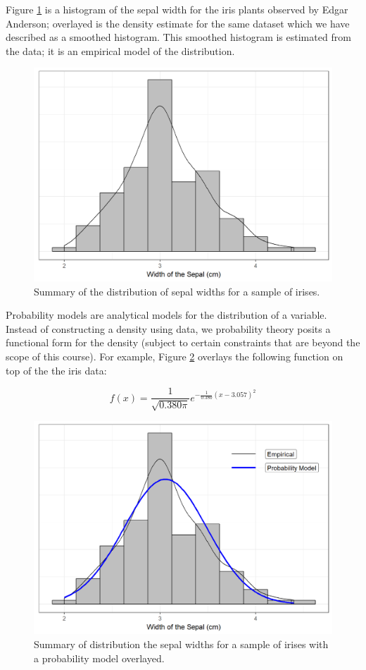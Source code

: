 \documentclass[]{book}
\theoremstyle{definition}
\theoremstyle{definition}
\theoremstyle{definition}
\theoremstyle{remark}
\begin{document}
Figure \ref{fig:anovaclassical-iris-histogram} is a histogram of the
sepal width for the iris plants observed by Edgar Anderson; overlayed is
the density estimate for the same dataset which we have described as a
smoothed histogram. This smoothed histogram is estimated from the data;
it is an empirical model of the distribution.

\begin{figure}

{\centering \includegraphics[width=0.8\linewidth]{./Images/anovaclassical-iris-histogram-1} 

}

\caption{Summary of the distribution of sepal widths for a sample of irises.}\label{fig:anovaclassical-iris-histogram}
\end{figure}

Probability models are analytical models for the distribution of a
variable. Instead of constructing a density using data, we probability
theory posits a functional form for the density (subject to certain
constraints that are beyond the scope of this course). For example,
Figure \ref{fig:anovaclassical-iris-normal} overlays the following
function on top of the the iris data:

\[f(x) = \frac{1}{\sqrt{0.380\pi}} e^{-\frac{1}{0.380}(x - 3.057)^2}\]

\begin{figure}

{\centering \includegraphics[width=0.8\linewidth]{./Images/anovaclassical-iris-normal-1} 

}

\caption{Summary of distribution  the sepal widths for a sample of irises with a probability model overlayed.}\label{fig:anovaclassical-iris-normal}
\end{figure}
\end{document}
